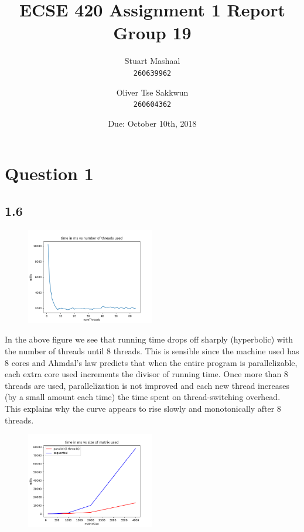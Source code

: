 \documentclass[11pt, letterpaper]{article}
\title{ECSE 420 Assignment 1 Report\\Group 19}
\author{
    Stuart Mashaal\\
    \texttt{260639962}
    \and
    Oliver Tse Sakkwun\\
    \texttt{260604362}
}
\date{Due: October 10th, 2018}
\begin{document}
\begin{titlepage}
    \maketitle
    \thispagestyle{empty}
    \setcounter{page}{0}
\end{titlepage}

\section*{Question 1}

\subsection*{1.6}

\begin{figure}[h]
    \centering
    \includegraphics[width=0.5\textwidth]{thread_count_plot.png}
\end{figure}

In the above figure we see that running time drops off sharply (hyperbolic) with the number of
threads until 8 threads. This is sensible since the machine used has 8 cores and Ahmdal's law
predicts that when the entire program is parallelizable, each extra core used increments
the divisor of running time. Once more than 8 threads are used, parallelization is not improved and
each new thread increases (by a small amount each time) the time spent on thread-switching overhead.\\

This explains why the curve appears to rise slowly and monotonically after 8 threads.

\begin{figure}[h]
    \centering
    \includegraphics[width=0.5\textwidth]{matrix_size_plot.png}
\end{figure}
\end{document}
